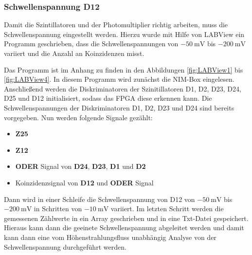 \documentclass{article}
\begin{document}
\subsubsection*{Schwellenspannung D12}
Damit die Szintillatoren und der Photomultiplier richtig arbeiten, muss die Schwellenspannung eingestellt werden.
Hierzu wurde mit Hilfe von LABView ein Programm geschrieben, dass die Schwellenspannungen von $\SI{-50}{\milli\volt}$ bis $\SI{-200}{\milli\volt}$ variiert und die Anzahl an Koinzidenzen misst.

Das Programm ist im Anhang zu finden in den Abbildungen \ref{fig:LABView1} bis \ref{fig:LABView4}.
In diesem Programm wird zunächst die NIM-Box eingelesen. Anschließend werden die Diskriminatoren der Szinitillatoren D1, D2, D23, D24, D25 und D12 initialisiert, sodass das FPGA diese erkennen kann.	
Die Schwellenspannungen der Diskriminatoren D1, D2, D23 und D24 sind bereits vorgegeben.
Nun werden folgende Signale gezählt:
\begin{itemize}
    \item \textbf{Z25}
    \item \textbf{Z12}
    \item \textbf{ODER} Signal von \textbf{D24}, \textbf{D23}, \textbf{D1} und \textbf{D2}
    \item Koinzidenzsignal von \textbf{D12} und \textbf{ODER} Signal  	
\end{itemize}
Dann wird in einer Schleife die Schwellenspannung von D12 von $\SI{-50}{\milli\volt}$ bis $\SI{-200}{\milli\volt}$ in Schritten von $\SI{-10}{\milli\volt}$ variiert.
Im letzten Schritt werden die gemessenen Zählwerte in ein Array geschrieben und in eine Txt-Datei gespeichert.
Hieraus kann dann die geeinete Schwellenspannung abgeleitet werden und
damit kann dann eine vom Höhenstrahlungsfluss unabhängig Analyse von der Schwellenspannung durchgeführt werden.
\end{document}
